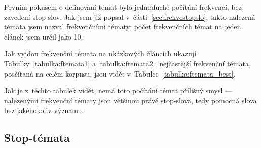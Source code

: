 \documentclass[12pt,a4paper]{report}
\begin{document}




Prvním pokusem o definování témat bylo jednoduché počítání frekvencí, bez zavedení stop slov. Jak jsem již popsal v~části~\ref{sec:frekvestopslo}, takto nalezená témata jsem nazval frekvenčními tématy; počet frekvenčních témat na jeden článek jsem určil jako 10. 

Jak vyjdou frekvenční témata na ukázkových článcích ukazují Tabulky~\ref{tabulka:ftemata1} a \ref{tabulka:ftemata2}; nejčastější frekvenční témata, posčítaná na celém korpusu, jsou vidět v~Ta\-bul\-ce~\ref{tabulka:ftemata_best}. 

Jak je z~těchto tabulek vidět, nemá toto počítání témat přílišný smysl --- nalezenými frekvenční tématy jsou většinou právě stop-slova, tedy pomocná slova bez jakéhokoliv významu. 


\subsection{Stop-témata}
\label{sec:stemata}
\end{document}
